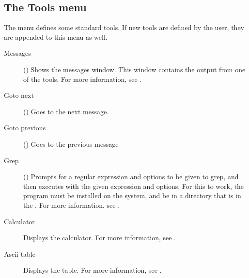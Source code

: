 \subsection{The Tools menu}
\label{se:menutools}
The  menu defines some standard tools. If new tools are defined by the
user, they are appended to this menu as well.
\begin{description}
\item[Messages] () Shows the messages window.
This window contains the output from one of the tools. For more information,
see .
\item[Goto next] () Goes to the next message.
\item[Goto previous] () Goes to the previous message
\item[Grep] () Prompts for a regular expression and options
to be given to grep, and then executes  with the given expression and
options. For this to work, the  program must be installed on the
system, and be in a directory that is in the . For more
information, see .
\item[Calculator]
Displays the calculator. For more information, see .
\item[Ascii table] Displays the  table. For more information, see
.
\end{description}
%
%
